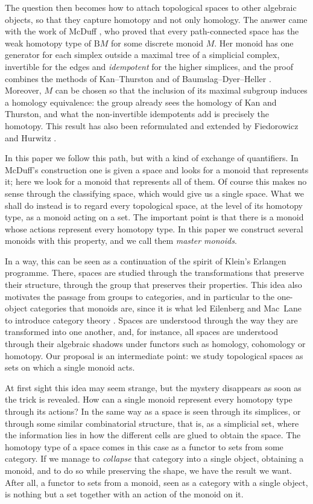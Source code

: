 \documentclass[11pt]{amsart}
\theoremstyle{definition}
\theoremstyle{remark}
\numberwithin{figure}{section}%
\newcommand{\B}{\mathrm{B}}
\begin{document}
The question then becomes how to attach topological spaces to other algebraic objects, so that they capture homotopy and not only homology. The answer came with the work of McDuff \cite{McDuff}, who proved that every path-connected space has the weak homotopy type of $\B M$ for some discrete monoid $M$. Her monoid has one generator for each simplex outside a maximal tree of a simplicial complex, invertible for the edges and \emph{idempotent} for the higher simplices, and the proof combines the methods of Kan--Thurston and of Baumslag--Dyer--Heller \cite{KT,BDH}. Moreover, $M$ can be chosen so that the inclusion of its maximal subgroup induces a homology equivalence: the group already sees the homology of Kan and Thurston, and what the non-invertible idempotents add is precisely the homotopy. This result has also been reformulated and extended by Fiedorowicz and Hurwitz \cite{Fied,Hurwitz}.

In this paper we follow this path, but with a kind of exchange of quantifiers. In McDuff's construction one is given a space and looks for a monoid that represents it; here we look for a monoid that represents all of them. Of course this makes no sense through the classifying space, which would give us a single space. What we shall do instead is to regard every topological space, at the level of its homotopy type, as a monoid acting on a set. The important point is that there is a monoid whose actions represent every homotopy type. In this paper we construct several monoids with this property, and we call them \emph{master monoids}.

In a way, this can be seen as a continuation of the spirit of Klein's Erlangen programme. There, spaces are studied through the transformations that preserve their structure, through the group that preserves their properties. This idea also motivates the passage from groups to categories, and in particular to the one-object categories that monoids are, since it is what led Eilenberg and Mac~Lane to introduce category theory \cite{EM45}. Spaces are understood through the way they are transformed into one another, and, for instance, all spaces are understood through their algebraic shadows under functors such as homology, cohomology or homotopy. Our proposal is an intermediate point: we study topological spaces as sets on which a single monoid acts.

At first sight this idea may seem strange, but the mystery disappears as soon as the trick is revealed. How can a single monoid represent every homotopy type through its actions? In the same way as a space is seen through its simplices, or through some similar combinatorial structure, that is, as a simplicial set, where the information lies in how the different cells are glued to obtain the space. The homotopy type of a space comes in this case as a functor to sets from some category. If we manage to \emph{collapse} that category into a single object, obtaining a monoid, and to do so while preserving the shape, we have the result we want. After all, a functor to sets from a monoid, seen as a category with a single object, is nothing but a set together with an action of the monoid on it.
\end{document}
